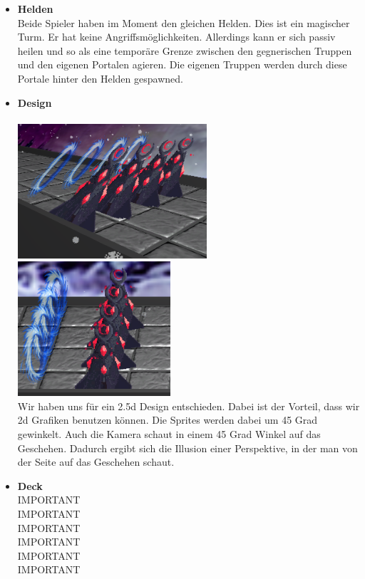 \begin{itemize}
    \item \textbf{Helden} \\
        Beide Spieler haben im Moment den gleichen Helden. Dies ist ein magischer Turm. Er hat keine Angriffsmöglichkeiten. Allerdings kann er sich passiv heilen und so als eine
        temporäre Grenze zwischen den gegnerischen Truppen und den eigenen Portalen agieren. Die eigenen Truppen werden durch diese Portale hinter den Helden gespawned.
    \item \textbf{Design} \\
        \\
        \includegraphics*[height=5cm]{resources/25d.png} \includegraphics*[height=5cm]{resources/25dtwo.png}\\
        Wir haben uns für ein 2.5d Design entschieden. Dabei ist der Vorteil, dass wir 2d Grafiken benutzen können. Die Sprites werden dabei um 45 Grad gewinkelt. Auch 
        die Kamera schaut in einem 45 Grad Winkel auf das Geschehen. Dadurch ergibt sich die Illusion einer Perspektive, in der man von der Seite auf das Geschehen schaut.  
    \item \textbf{Deck} \\
        IMPORTANT\\
        IMPORTANT\\
        IMPORTANT\\
        IMPORTANT\\
        IMPORTANT\\
        IMPORTANT\\

\end{itemize}
